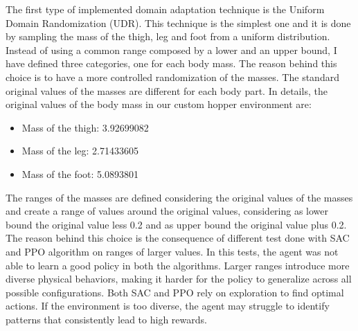 \documentclass[12pt]{article}
\begin{document}
The first type of implemented domain adaptation technique is the Uniform Domain Randomization (UDR). This technique is the simplest one and it is done by sampling the mass of the thigh, leg and foot from a uniform distribution. Instead of using a common range composed by a lower and an upper bound, I have defined three categories, one for each body mass. The reason behind this choice is to have a more controlled randomization of the masses. The standard original values of the masses are different  for each body part. In details, the original values of the body mass in our custom hopper environment are:
\begin{itemize}
    \item Mass of the thigh: 3.92699082
    \item Mass of the leg: 2.71433605
    \item Mass of the foot: 5.0893801
\end{itemize}

The ranges of the masses are defined considering the original values of the masses and create a range of values around the original values, considering as lower bound the original value less 0.2 and as upper bound the original value plus 0.2. The reason behind this choice is the consequence of different test done with SAC and PPO algorithm on ranges of larger values. In this tests, the agent was not able to learn a good policy in both the algorithms. Larger ranges introduce more diverse physical behaviors, making it harder for the policy to generalize across all possible configurations. Both SAC and PPO rely on exploration to find optimal actions. If the environment is too diverse, the agent may struggle to identify patterns that consistently lead to high rewards.
\end{document}
